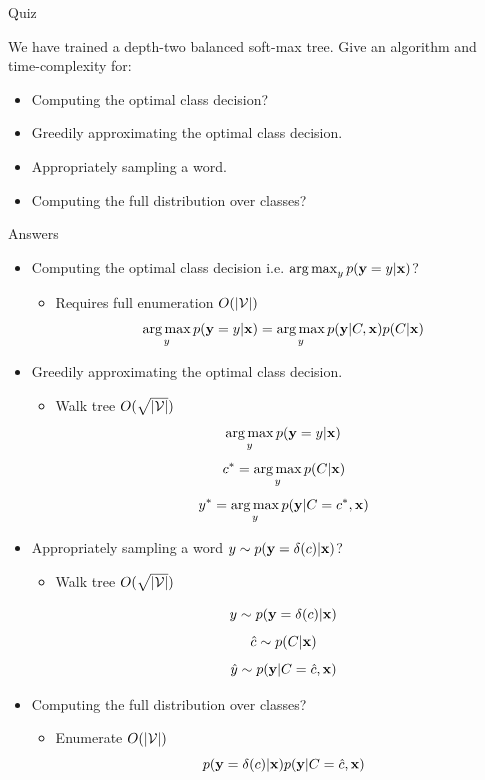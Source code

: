 \documentclass{beamer}
\begin{document}
\begin{frame}{Quiz}

  We have trained a depth-two balanced soft-max tree.
  Give an algorithm and time-complexity for:

  \begin{itemize}
  \item Computing the optimal class decision?
  \item Greedily approximating the optimal class decision.
  \item Appropriately sampling a word.
  \item Computing the full distribution over classes?
  \end{itemize}
\end{frame}


\begin{frame}[allowframebreaks]{Answers}
  \begin{itemize}
  \item Computing the optimal class decision i.e. $\argmax_{y} p(\boldy = y| \boldx)$?
    \air 

    \begin{itemize}
    \item Requires full enumeration $O(|\mathcal{V}|)$ 
      \[\argmax_{y} p(\boldy =y | \boldx) = \argmax_{y} p(\boldy | C, \boldx) p(C | \boldx) \]
    \end{itemize}

  \item Greedily approximating the optimal class decision.
    \begin{itemize}
    \item Walk tree $O(\sqrt{|\mathcal{V}|})$ 
      \[\argmax_{y} p(\boldy =y | \boldx)  \]
      \[c^* = \argmax_{y}  p(C | \boldx)\]
      \[y^* = \argmax_{y}  p(\boldy | C=c^*, \boldx)\]
    \end{itemize}
   \air 

  \item Appropriately sampling a word $y \sim p(\mathbf{y} =\delta(c) | \mathbf{x})$?
    \begin{itemize}
    \item Walk tree $O(\sqrt{|\mathcal{V}|})$ 

      \[y \sim p(\mathbf{y} =\delta(c) | \mathbf{x})\] 
      \[\hat{c} \sim   p(C | \mathbf{x})\]
      \[\hat{y} \sim   p(\mathbf{y} | C=\hat{c}, \mathbf{x})\]
    \end{itemize}


  \item Computing the full distribution over classes?
    \begin{itemize}
    \item  Enumerate $O(|\mathcal{V}|)$ 
      \[  p(\mathbf{y} =\delta(c) | \mathbf{x}) p(\mathbf{y} | C=\hat{c}, \mathbf{x}) \] 
    \end{itemize}

  \end{itemize}
\end{frame}
\end{document}
